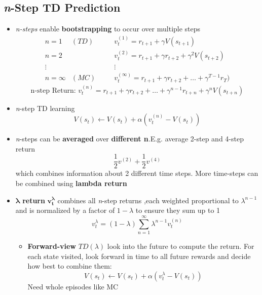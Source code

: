 \documentclass[12pt]{article} %
\begin{document}
\subsection{\textit{n}-Step TD Prediction}
\begin{itemize}
\item \textit{n-steps} enable \textbf{bootstrapping} to occur over multiple steps
$$\begin{matrix}
 n=1 &(TD) & \quad &  v_t^{(1)}= r_{t+1}+\gamma V(s_{t+1}) \\
 n=2 	& & \quad &v_t^{(2)} = r_{t+1}+\gamma r_{t+2} + \gamma^2 V(s_{t+2})\\
 \vdots & & \quad &\vdots \\
 n=\infty &(MC) &\quad &  v_t^{(\infty)} = r_{t+1}+\gamma r_{t+2} + \hdots+ \gamma^{T-1}r_T)
\end{matrix}$$
$$ \text{n-step Return: } v_t^{(n)}=r_{t+1}+\gamma r_{t+2}+ \hdots +\gamma^{n-1}r_{t+n}+ \gamma^n V(s_{t+n})$$
\item \textit{n}-step TD learning
$$ V(s_t) \leftarrow V(s_t)+\alpha(v_t^{(n)}-V(s_t))$$

\item \textit{n}-steps can be \textbf{averaged} over \textbf{different n}.E.g. average 2-step and 4-step return 
$$ \frac{1}{2}v^{(2)} + \frac{1}{2}v^{(4)}$$
which combines information about 2 different time steps. More time-steps can be combined using \textbf{lambda return}

\item $\bm{\lambda}$ \textbf{return} $\bm{v_t^{\lambda}}$ combines all \textit{n}-step returns ,each weighted proportional to $\lambda^{n-1}$ and is normalized by a factor of $1-\lambda$ to ensure they sum up to 1
$$ v_t^{\lambda}= (1-\lambda) \sum _{n=1}^\infty \lambda^{n-1}v_t^{(n)}$$

\begin{itemize}
\item \textbf{Forward-view} $TD(\lambda)$  look into the future to compute the return. For each state visited, look forward in time to all future rewards and decide how best to combine them: $$V(s_t) \leftarrow V(s_t)+\alpha(v_t^{\lambda} - V(s_t))$$
Need whole episodes like MC


\end{itemize}
\end{itemize}
\end{document}
